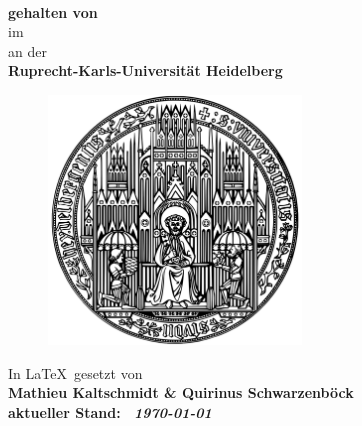 
\begin{titlepage}
	\begin{center}
		\makeatletter
		
		\thispagestyle{empty}
		
		\Huge\textbf{\@title} \\
		\vspace{5mm}
		\Large\textbf{ gehalten von \@author} \\
		\large{im \@date} \\
		\vspace{5mm}
		\large{an der} \\
		\Large\textbf{Ruprecht-Karls-Universität Heidelberg} \\
		\vfill
		\begin{figure}[H]
			\centering
			\includegraphics*[width=0.6\textwidth]{figures/logo-uni-hd-small}
		\end{figure}
	    \vfill
		\Large
		In \LaTeX \ gesetzt von \\ 
		\vspace{3mm}
		\bfseries{
		Mathieu Kaltschmidt
		\& 
		Quirinus Schwarzenböck}\\ 	
	   \vfill
	   \normalfont
	   aktueller Stand: \  \textit{\today}
	   \vfill
		\makeatother
	\end{center}
\blankpage
\end{titlepage}
